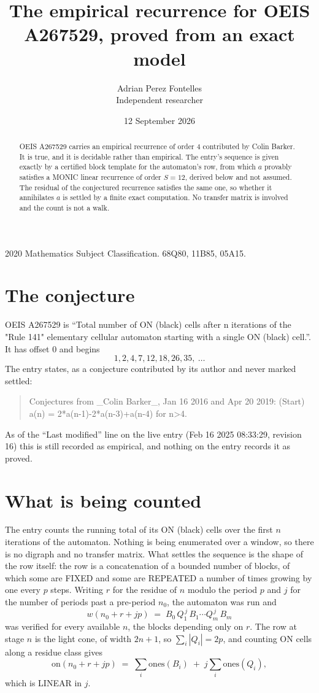 \documentclass[11pt,a4paper]{article}
\title{The empirical recurrence for OEIS A267529, proved from an exact model}
\author{Adrian Perez Fontelles\\ \small Independent researcher}
\date{12 September 2026}
\theoremstyle{plain}
\theoremstyle{definition}
\begin{document}
\maketitle

\begin{abstract}
OEIS A267529 carries an empirical recurrence of order $4$ contributed by Colin Barker. It is true, and it is
decidable rather than empirical. The entry's sequence is given exactly by a certified block template for the automaton's row, from
which $a$ provably satisfies a MONIC linear recurrence of order $S=12$, derived below and not
assumed. The residual of the conjectured recurrence satisfies the same one, so whether it
annihilates $a$ is settled by a finite exact computation. No transfer matrix is involved and
the count is not a walk.
\end{abstract}

\noindent\small 2020 Mathematics Subject Classification. 68Q80, 11B85, 05A15.\normalsize

\section{The conjecture}

OEIS A267529 is ``Total number of ON (black) cells after n iterations of the "Rule 141" elementary cellular automaton starting with a single ON (black) cell.''. It has offset $0$ and begins
\[
1, 2, 4, 7, 12, 18, 26, 35,\ \dots
\]
The entry states, as a conjecture contributed by its author and never marked settled:
\begin{quote}
Conjectures from \_Colin Barker\_, Jan 16 2016 and Apr 20 2019: (Start) a(n) = 2*a(n-1)-2*a(n-3)+a(n-4) for n>4.
\end{quote}
As of the ``Last modified'' line on the live entry (Feb 16 2025 08:33:29, revision 16)
this is still recorded as empirical, and nothing on the entry records it as proved.

\section{What is being counted}

The entry counts the running total of its ON (black) cells over the first $n$ iterations of the automaton. Nothing is being enumerated over a window, so there is
no digraph and no transfer matrix. What settles the sequence is the shape of the row itself:
the row is a concatenation of a bounded number of blocks, of which some are
FIXED and some are REPEATED a number of times growing by one every $p$ steps. Writing $r$ for
the residue of $n$ modulo the period $p$ and $j$ for the number of periods past a pre-period
$n_0$, the automaton was run and
\[
w(n_0 + r + jp)\;=\;B_0\,Q_1^{\,j}\,B_1\cdots Q_m^{\,j}\,B_m
\]
was verified for every available $n$, the blocks depending only on $r$. The
row at stage $n$ is the light cone, of width $2n+1$, so $\sum_i|Q_i|=2p$, and counting ON
cells along a residue class gives
\[
\mathrm{on}(n_0+r+jp)\;=\;\sum_i \mathrm{ones}(B_i)\;+\;j\sum_i \mathrm{ones}(Q_i),
\]
which is LINEAR in $j$.
\end{document}
